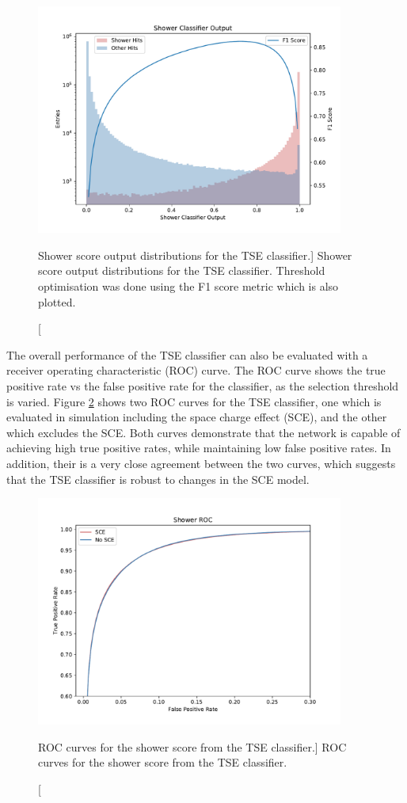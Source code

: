 \begin{figure}
	\centering
	\includegraphics[width=0.9\textwidth]{figures/shower_combined.pdf} 
	\caption
	[Shower score output distributions for the TSE classifier.]
	{Shower score output distributions for the TSE classifier. Threshold 
	optimisation was done using the F1 score metric which is also plotted.}
	\label{fig:show_output}
\end{figure}

The overall performance of the TSE classifier can also be evaluated with a
receiver operating characteristic (ROC) curve\cite{Fawcett2006}. The ROC curve
shows the true positive rate vs the false positive rate for the classifier, as
the selection threshold is varied. Figure \ref{fig:show_roc} shows two ROC
curves for the TSE classifier, one which is evaluated in simulation including
the space charge effect (SCE), and the other which excludes the SCE. Both curves
demonstrate that the network is capable of achieving high true positive rates,
while maintaining low false positive rates. In addition, their is a very close
agreement between the two curves, which suggests that the TSE classifier is
robust to changes in the SCE model.

\begin{figure}
	\centering
	\includegraphics[width=0.9\textwidth]{figures/show_roc_comparison.pdf}
	\caption
	[ROC curves for the shower score from the TSE classifier.]
	{ROC curves for the shower score from the TSE classifier.}
	\label{fig:show_roc}
\end{figure}

